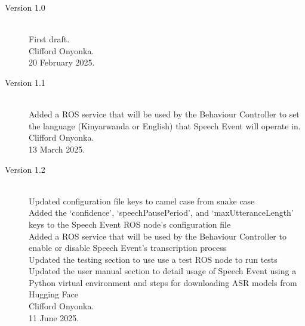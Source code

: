 \documentclass{CSSRforAfrica}
\begin{document}
\begin{description}

\item [Version 1.0]~\\
First draft. \\
Clifford Onyonka. \\                                     %
20 February 2025.                                                        %

\item [Version 1.1]~\\
Added a ROS service that will be used by the Behaviour Controller to set the language (Kinyarwanda or English) that Speech Event will operate in. \\
Clifford Onyonka. \\
13 March 2025.

\item [Version 1.2]~\\
Updated configuration file keys to camel case from snake case \\
Added the `confidence', `speechPausePeriod', and `maxUtteranceLength' keys to the Speech Event ROS node's configuration file \\
Added a ROS service that will be used by the Behaviour Controller to enable or disable Speech Event's transcription process \\
Updated the testing section to use use a test ROS node to run tests \\
Updated the user manual section to detail usage of Speech Event using a Python virtual environment and steps for downloading ASR models from Hugging Face \\
Clifford Onyonka. \\
11 June 2025.



\end{description}
\end{document}
